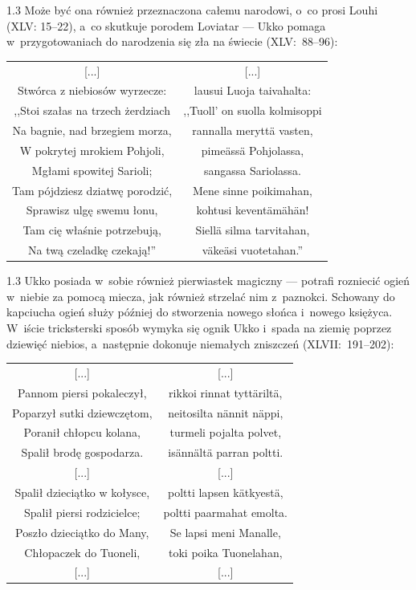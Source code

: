\documentclass[11pt,a4paper,twoside]{report}
\begin{document}
\begin{spacing}{1.3}
Może być ona również przeznaczona całemu narodowi, o~co prosi Louhi (XLV: 15--22), a~co skutkuje porodem Loviatar --- Ukko pomaga w~przygotowaniach do narodzenia się zła na świecie (XLV:~88--96):
\end{spacing}
{\centering
\small
\begin{longtable}{c c}
{[...]} & {[...]} \\
Stwórca z niebiosów wyrzecze: & lausui Luoja taivahalta:\\
,,Stoi szałas na trzech żerdziach & ,,Tuoll' on suolla kolmisoppi \\
Na bagnie, nad brzegiem morza, & rannalla meryttä vasten, \\
W pokrytej mrokiem Pohjoli, & pimeässä Pohjolassa, \\
Mgłami spowitej Sarioli; & sangassa Sariolassa. \\
Tam pójdziesz dziatwę porodzić, & Mene sinne poikimahan, \\
Sprawisz ulgę swemu łonu, & kohtusi keventämähän! \\
Tam cię właśnie potrzebują, & Siellä silma tarvitahan, \\
Na twą czeladkę czekają!'' & väkeäsi vuotetahan.'' \\
\end{longtable}
}
\begin{spacing}{1.3}
Ukko posiada w~sobie również pierwiastek magiczny --- potrafi rozniecić ogień w~niebie za pomocą miecza, jak również strzelać nim z~paznokci. Schowany do kapciucha ogień służy później do stworzenia nowego słońca i~nowego księżyca. W~iście tricksterski sposób wymyka się ognik Ukko i~spada na ziemię poprzez dziewięć niebios, a~następnie dokonuje niemałych zniszczeń (XLVII:~191--202):
\end{spacing}
\newpage
{\centering
\small
\begin{longtable}{c c}
{[...]} & {[...]}\\
Pannom piersi pokaleczył, & rikkoi rinnat tyttäriltä, \\
Poparzył sutki dziewczętom, & neitosilta nännit näppi, \\
Poranił chłopcu kolana, & turmeli pojalta polvet, \\
Spalił brodę gospodarza. & isännältä parran poltti. \\
{[...]} & {[...]} \\
Spalił dzieciątko w kołysce, & poltti lapsen kätkyestä, \\
Spalił piersi rodzicielce; & poltti paarmahat emolta. \\
Poszło dzieciątko do Many, & Se lapsi meni Manalle, \\
Chłopaczek do Tuoneli, & toki poika Tuonelahan, \\
{[...]} & {[...]} \\
\end{longtable}
}
\end{document}
